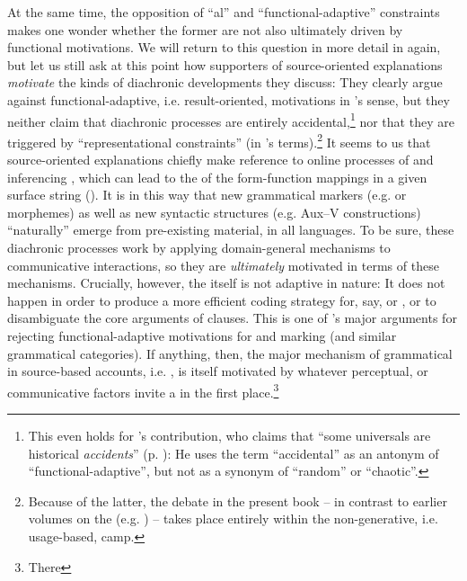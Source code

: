 \documentclass[output=paper]{langsci/langscibook}
\begin{document}
At the same time, the opposition of “al” and “functional-adaptive” constraints makes one wonder whether the former are not also ultimately driven by functional motivations. We will return to this question in more detail in  again, but let us still ask at this point how supporters of source-oriented explanations \textit{motivate} the kinds of diachronic developments they discuss: They clearly argue against functional-adaptive, i.e. result-oriented, motivations in ’s sense, but they neither claim that diachronic processes are entirely accidental,\footnote{This even holds for ’s contribution, who claims that “some universals are historical \textit{accidents}” (p. \pageref{p:collins:historicalaccidents}): He uses the term “accidental” as an anto\-nym of “functional-adaptive”, but not as a synonym of “random” or “chaotic”.} nor that they are triggered by  “representational constraints” (in ’s terms).\footnote{Because of the latter, the debate in the present book – in contrast to earlier volumes on the  (e.g. \citealt{Hawkins1988_ExplEd,Good2008_Change}) – takes place entirely within the non-generative, i.e. usage-based, camp.} It seems to us that source-oriented explanations chiefly make reference to online processes of  and inferencing \citep{Bybee2010}, which can lead to the  of the form-function mappings in a given surface string (\citealt{Croft2000,DeSmet2009}). It is in this way that new grammatical markers (e.g.  or  morphemes) as well as new syntactic structures (e.g. Aux–V constructions) “naturally” emerge from pre-existing material, in all languages. To be sure, these diachronic processes work by applying domain-general  mechanisms to communicative interactions, so they are \textit{ultimately} motivated in terms of these mechanisms. Crucially, however, the  itself is not adaptive in nature: It does not happen in order to produce a more efficient coding strategy for, say,  or , or to disambiguate the core arguments of  clauses. This is one of ’s major arguments for rejecting functional-adaptive motivations for  and  marking (and similar grammatical categories). If anything, then, the major mechanism of grammatical  in source-based accounts, i.e. , is itself motivated by whatever perceptual,  or communicative factors invite a  in the first place.\footnote{There 
}
\end{document}
